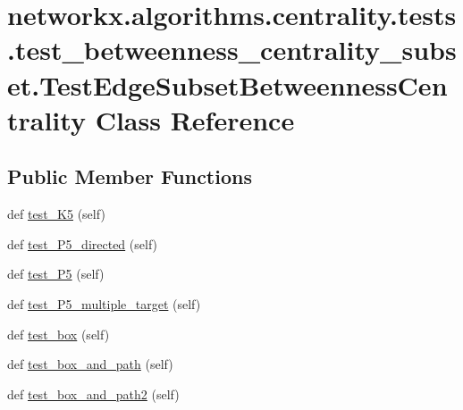 \hypertarget{classnetworkx_1_1algorithms_1_1centrality_1_1tests_1_1test__betweenness__centrality__subset_1_1Tf34b72e23226bda9408e58bb44a2bc70}{}\section{networkx.\+algorithms.\+centrality.\+tests.\+test\+\_\+betweenness\+\_\+centrality\+\_\+subset.\+Test\+Edge\+Subset\+Betweenness\+Centrality Class Reference}
\label{classnetworkx_1_1algorithms_1_1centrality_1_1tests_1_1test__betweenness__centrality__subset_1_1Tf34b72e23226bda9408e58bb44a2bc70}
\subsection*{Public Member Functions}
\begin{DoxyCompactItemize}
\item 
def \hyperlink{classnetworkx_1_1algorithms_1_1centrality_1_1tests_1_1test__betweenness__centrality__subset_1_1Tf34b72e23226bda9408e58bb44a2bc70_a8db6d16610caf0563becf1d2bd93310d}{test\+\_\+\+K5} (self)
\item 
def \hyperlink{classnetworkx_1_1algorithms_1_1centrality_1_1tests_1_1test__betweenness__centrality__subset_1_1Tf34b72e23226bda9408e58bb44a2bc70_ae7f513c4569b435378e8b0145789e7f8}{test\+\_\+\+P5\+\_\+directed} (self)
\item 
def \hyperlink{classnetworkx_1_1algorithms_1_1centrality_1_1tests_1_1test__betweenness__centrality__subset_1_1Tf34b72e23226bda9408e58bb44a2bc70_ac231e90cfc570197a8ba512873e5001b}{test\+\_\+\+P5} (self)
\item 
def \hyperlink{classnetworkx_1_1algorithms_1_1centrality_1_1tests_1_1test__betweenness__centrality__subset_1_1Tf34b72e23226bda9408e58bb44a2bc70_a0508a6dfad3d0e222ea54dd02dad8f5d}{test\+\_\+\+P5\+\_\+multiple\+\_\+target} (self)
\item 
def \hyperlink{classnetworkx_1_1algorithms_1_1centrality_1_1tests_1_1test__betweenness__centrality__subset_1_1Tf34b72e23226bda9408e58bb44a2bc70_a19497f87cc7838e4c79af0792c9aa374}{test\+\_\+box} (self)
\item 
def \hyperlink{classnetworkx_1_1algorithms_1_1centrality_1_1tests_1_1test__betweenness__centrality__subset_1_1Tf34b72e23226bda9408e58bb44a2bc70_a36696ca39b4995d8e47514f9efe19e5b}{test\+\_\+box\+\_\+and\+\_\+path} (self)
\item 
def \hyperlink{classnetworkx_1_1algorithms_1_1centrality_1_1tests_1_1test__betweenness__centrality__subset_1_1Tf34b72e23226bda9408e58bb44a2bc70_aea554bc2f2525e7c8696baec47ffebac}{test\+\_\+box\+\_\+and\+\_\+path2} (self)
\end{DoxyCompactItemize}


